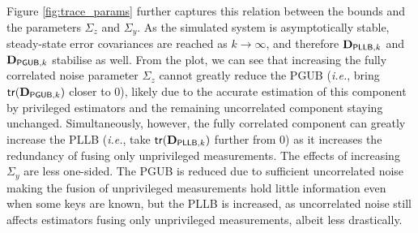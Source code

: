 Figure \ref{fig:trace_params} further captures this relation between the bounds and the parameters $\Sigma_z$ and $\Sigma_y$. As the simulated system is asymptotically stable, steady-state error covariances are reached as $k \to \infty$, and therefore ${{\mathbf{D}}}_{\mathsf{PLLB},k}$ and ${{\mathbf{D}}}_{\mathsf{PGUB},k}$ stabilise as well. From the plot, we can see that increasing the fully correlated noise parameter $\Sigma_z$ cannot greatly reduce the PGUB (\textit{i.e.}, bring $\mathsf{tr}({{\mathbf{D}}}_{\mathsf{PGUB},k})$ closer to $0$), likely due to the accurate estimation of this component by privileged estimators and the remaining uncorrelated component staying unchanged. Simultaneously, however, the fully correlated component can greatly increase the PLLB (\textit{i.e.}, take $\mathsf{tr}({{\mathbf{D}}}_{\mathsf{PLLB},k})$ further from $0$) as it increases the redundancy of fusing only unprivileged measurements. The effects of increasing $\Sigma_y$ are less one-sided. The PGUB is reduced due to sufficient uncorrelated noise making the fusion of unprivileged measurements hold little information even when some keys are known, but the PLLB is increased, as uncorrelated noise still affects estimators fusing only unprivileged measurements, albeit less drastically.

